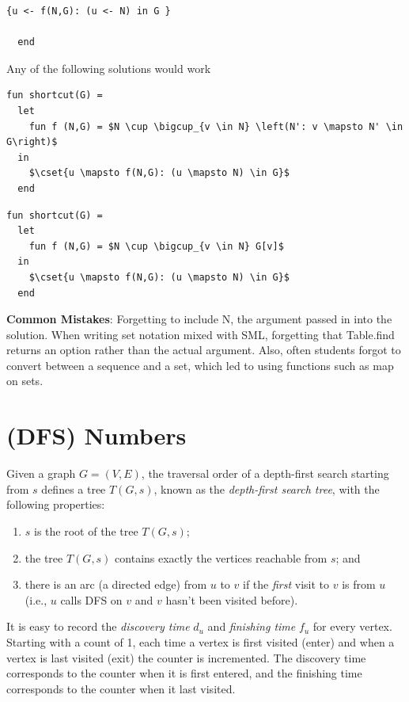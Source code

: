 \begin{problem}
\begin{lstlisting}[numbers=none]
    {u <- f(N,G): (u <- N) in G }

  end

\end{lstlisting}

\sol
Any of the following solutions would work 
\begin{lstlisting}[numbers=none]
fun shortcut(G) = 
  let 
    fun f (N,G) = $N \cup \bigcup_{v \in N} \left(N': v \mapsto N' \in G\right)$
  in   
    $\cset{u \mapsto f(N,G): (u \mapsto N) \in G}$
  end
\end{lstlisting}

\begin{lstlisting}[numbers=none]
fun shortcut(G) = 
  let 
    fun f (N,G) = $N \cup \bigcup_{v \in N} G[v]$
  in   
    $\cset{u \mapsto f(N,G): (u \mapsto N) \in G}$
  end
\end{lstlisting}

\notes
\textbf{Common Mistakes}: Forgetting to include N, the argument passed in into the solution. When writing set notation mixed with SML, forgetting that Table.find returns an option rather than the actual argument. Also, often students forgot to convert between a sequence and a set, which led to using functions such as map on sets.

\end{problem}



\section{(DFS) Numbers}

Given a graph $G = (V,E)$, the traversal order of a depth-first search starting
from $s$ defines a tree $T(G, s)$, known as the \emph{depth-first search tree},
with the following properties:
\begin{enumerate}[itemsep=2pt,topsep=0pt,label=(\roman*),
  labelindent=2\parindent,
  leftmargin=*]
\item $s$ is the root of the tree $T(G,s)$;
\item the tree $T(G,s)$ contains exactly the vertices reachable from $s$; and
\item there is an arc (a directed edge) from $u$ to $v$ if the
  \emph{first} visit to $v$ is
from $u$ (i.e., $u$ calls DFS on $v$ and $v$ hasn't been visited before).
\end{enumerate}

It is easy to record the \emph{discovery time} $d_u$ and
\emph{finishing time} $f_u$ for every vertex.  Starting with a count
of 1, each time a vertex is
first visited (enter) and when a vertex is
last visited (exit) the counter is incremented.  The discovery time
corresponds to the counter when it is first entered, and the finishing
time corresponds to the counter when it last visited.



